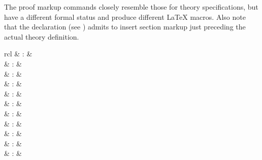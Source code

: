 \begin{isabellebody}
\begin{isamarkuptext}
  \medskip The proof markup commands closely resemble those for theory
  specifications, but have a different formal status and produce
  different {\LaTeX} macros.  Also note that the \hyperlink{command.header}{\mbox{}} declaration (see ) admits to insert
  section markup just preceding the actual theory definition.%
\end{isamarkuptext}%
\isamarkuptrue%
%
\isamarkuptrue%
%
\begin{isamarkuptext}%
\begin{matharray}{rcl}
    \hypertarget{antiquotation.theory}{\hyperlink{antiquotation.theory}{\mbox{}}} & : & \isarantiq \\
    \hypertarget{antiquotation.thm}{\hyperlink{antiquotation.thm}{\mbox{}}} & : & \isarantiq \\
    \hypertarget{antiquotation.prop}{\hyperlink{antiquotation.prop}{\mbox{}}} & : & \isarantiq \\
    \hypertarget{antiquotation.term}{\hyperlink{antiquotation.term}{\mbox{}}} & : & \isarantiq \\
    \hypertarget{antiquotation.const}{\hyperlink{antiquotation.const}{\mbox{}}} & : & \isarantiq \\
    \hypertarget{antiquotation.abbrev}{\hyperlink{antiquotation.abbrev}{\mbox{}}} & : & \isarantiq \\
    \hypertarget{antiquotation.typeof}{\hyperlink{antiquotation.typeof}{\mbox{}}} & : & \isarantiq \\
    \hypertarget{antiquotation.typ}{\hyperlink{antiquotation.typ}{\mbox{}}} & : & \isarantiq \\
    \hypertarget{antiquotation.thm-style}{\hyperlink{antiquotation.thm-style}{\mbox{}}} & : & \isarantiq \\
    \hypertarget{antiquotation.term-style}{\hyperlink{antiquotation.term-style}{\mbox{}}} & : & \isarantiq \\
    \hypertarget{antiquotation.text}{\hyperlink{antiquotation.text}{\mbox{}}} & : & \isarantiq \\

\end{matharray}
\end{isamarkuptext}
\end{isabellebody}
